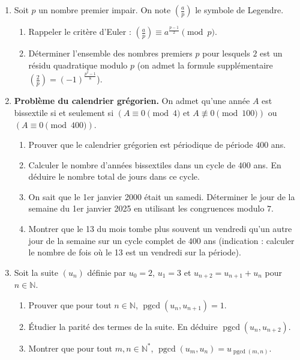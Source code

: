 \documentclass[11pt]{article}
\begin{document}
\begin{exercice}
\begin{enumerate}
    \item Soit $p$ un nombre premier impair. On note $\left(\frac{a}{p}\right)$ le symbole de Legendre.
    \begin{enumerate}
        \item Rappeler le critère d'Euler : $\left(\frac{a}{p}\right) \equiv a^{\frac{p-1}{2}} \pmod p$.
        \item Déterminer l'ensemble des nombres premiers $p$ pour lesquels $2$ est un résidu quadratique modulo $p$ (on admet la formule supplémentaire $\left(\frac{2}{p}\right) = (-1)^{\frac{p^2-1}{8}}$).
    \end{enumerate}
    \item \textbf{Problème du calendrier grégorien.} On admet qu'une année $A$ est bissextile si et seulement si $(A \equiv 0 \pmod 4 \text{ et } A \not\equiv 0 \pmod{100})$ ou $(A \equiv 0 \pmod{400})$.
    \begin{enumerate}
        \item Prouver que le calendrier grégorien est périodique de période $400$ ans.
        \item Calculer le nombre d'années bissextiles dans un cycle de $400$ ans. En déduire le nombre total de jours dans ce cycle.
        \item On sait que le 1er janvier 2000 était un samedi. Déterminer le jour de la semaine du 1er janvier 2025 en utilisant les congruences modulo $7$.
        \item Montrer que le 13 du mois tombe plus souvent un vendredi qu'un autre jour de la semaine sur un cycle complet de $400$ ans (indication : calculer le nombre de fois où le 13 est un vendredi sur la période).
    \end{enumerate}
    \item Soit la suite $(u_n)$ définie par $u_0 = 2$, $u_1 = 3$ et $u_{n+2} = u_{n+1} + u_n$ pour $n \in \mathbb{N}$.
\providecommand{\pgcd}{\operatorname{pgcd}}
\begin{enumerate}
    \item Prouver que pour tout $n \in \mathbb{N}$, $\pgcd(u_n, u_{n+1}) = 1$.
    \item Étudier la parité des termes de la suite. En déduire $\pgcd(u_n, u_{n+2})$.
    \item Montrer que pour tout $m, n \in \mathbb{N}^*$, $\pgcd(u_m, u_n) = u_{\pgcd(m,n)}$.
\end{enumerate}
\end{enumerate}
\end{exercice}
\end{document}
